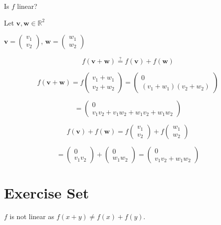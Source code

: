 Is $f$ linear?

Let $\mathbf{v}, \mathbf{w} \in \mathbb{R}^2$

$\mathbf{v} = \left( \begin{array}{c}
v_1 \\
v_2
\end{array} \right)$, $\mathbf{w} = \left( \begin{array}{c}
w_1 \\
w_2
\end{array} \right)$

\[
f(\mathbf{v} + \mathbf{w}) \stackrel{?}{=} f(\mathbf{v}) + f(\mathbf{w})
\]

\[
f(\mathbf{v} + \mathbf{w}) = f\left( \begin{array}{c}
v_1 + w_1 \\
v_2 + w_2
\end{array} \right) = \left( \begin{array}{c}
0 \\
(v_1 + w_1)(v_2 + w_2)
\end{array} \right)
\]

\[
= \left( \begin{array}{c}
0 \\
v_1v_2 + v_1w_2 + w_1v_2 + w_1w_2
\end{array} \right)
\]

\[
f(\mathbf{v}) + f(\mathbf{w}) = f\left( \begin{array}{c}
v_1 \\
v_2
\end{array} \right) + f\left( \begin{array}{c}
w_1 \\
w_2
\end{array} \right)
\]

\[
= \left( \begin{array}{c}
0 \\
v_1v_2
\end{array} \right) + \left( \begin{array}{c}
0 \\
w_1w_2
\end{array} \right) = \left( \begin{array}{c}
0 \\
v_1v_2 + w_1w_2
\end{array} \right)
\]

\section{Exercise Set}
$f$ is not linear as $f(x+y) \neq f(x) + f(y)$.

